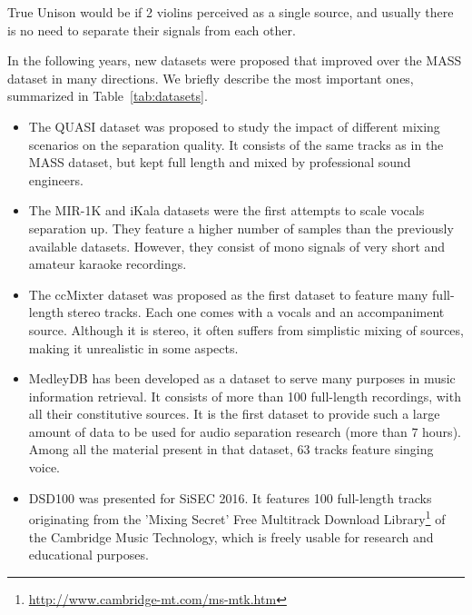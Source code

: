 True Unison would be if 2 violins perceived as a single source, and usually there is no need to separate their signals from each other.

In the following years, new datasets were proposed that improved over the MASS dataset in many directions. We briefly describe the most important ones, summarized in Table~\ref{tab:datasets}.
\begin{itemize}[leftmargin=*]
	\item The QUASI dataset was proposed to study the impact of different mixing scenarios on the separation quality. It  consists of the same tracks as in the MASS dataset, but kept full length and mixed by professional sound engineers.
	\item The MIR-1K and iKala datasets were the first attempts to scale vocals separation up. They feature a higher number of samples than the previously available datasets. However, they consist of mono signals of very short and amateur karaoke recordings.
	\item The ccMixter dataset was proposed as the first dataset to feature many full-length stereo tracks. Each one comes with a vocals and an accompaniment source. Although it is stereo, it often suffers from simplistic mixing of sources, making it unrealistic in some aspects.
	\item MedleyDB has been developed as a dataset to serve many purposes in music information retrieval. It consists of more than 100 full-length recordings, with all their constitutive sources. It is the first dataset to provide such a large amount of data to be used for audio separation research (more than 7 hours). Among all the material present in that dataset, 63 tracks feature singing voice.
  \item DSD100 was presented for SiSEC 2016. It features 100 full-length tracks originating from the 'Mixing Secret' Free Multitrack Download Library\footnote{\url{http://www.cambridge-mt.com/ms-mtk.htm}} of the Cambridge Music Technology, which is freely usable for research and educational purposes.
\end{itemize}

